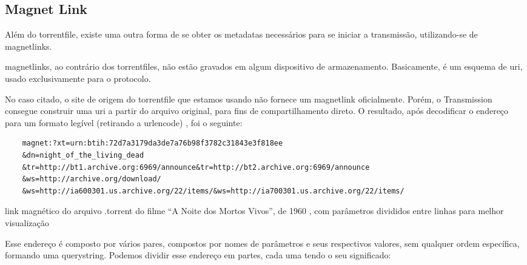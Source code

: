 
\subsection*{Magnet Link}

Além do \gls*{torrentfile}, existe uma outra forma de se obter os \glspl*{metadata}
necessários para se iniciar a transmissão, utilizando-se de \glspl{magnetlink}.

\Glspl*{magnetlink}, ao contrário dos \glspl*{torrentfile}, não estão gravados em
algum dispositivo de armazenamento. Basicamente, é um esquema de \gls{uri}, usado
exclusivamente para o protocolo.

No caso citado, o site de origem do \gls*{torrentfile} que estamos usando não fornece um
\gls*{magnetlink} oficialmente. Porém, o Transmission consegue construir uma \gls*{uri}
a partir do arquivo original, para fins de compartilhamento direto. O resultado, após
decodificar o endereço para um formato legível (retirando a \gls{urlencode})
\cite{wiki:urlencode}, foi o seguinte:

\begin{listing}[ht!]
    \begin{verbatim}
    magnet:?xt=urn:btih:72d7a3179da3de7a76b98f3782c31843e3f818ee
    &dn=night_of_the_living_dead
    &tr=http://bt1.archive.org:6969/announce&tr=http://bt2.archive.org:6969/announce
    &ws=http://archive.org/download/
    &ws=http://ia600301.us.archive.org/22/items/&ws=http://ia700301.us.archive.org/22/items/
    \end{verbatim}
    \caption{link magnético do arquivo .torrent do filme
    \enquote{A Noite dos Mortos Vivos}, de 1960 \cite{torrent-file}, com parâmetros
    divididos entre linhas para melhor visualização}
    \label{lst:torrent-file-magnet-link}
\end{listing}

Esse endereço é composto por vários pares, compostos por nomes de parâmetros e seus
respectivos valores, sem qualquer ordem específica, formando uma \gls{querystring}.
Podemos dividir esse endereço em partes, cada uma tendo o seu significado:

